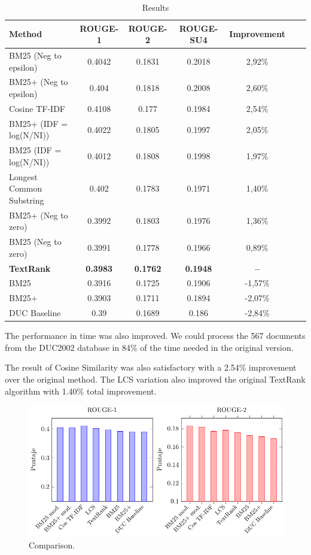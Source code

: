 \documentclass{llncs}
\begin{document}
\begin{table}
\caption{Results}
\begin{center}
\begin{tabular}{l*{5}{c}r}
\hline
\rule{0pt}{12pt}
Method & ROUGE-1 & ROUGE-2 & ROUGE-SU4 & Improvement \\[2pt]
\hline\rule{0pt}{12pt}\mbox{}\par\nobreak
BM25 (Neg to epsilon) & 0.4042 & 0.1831 & 0.2018 & 2,92\% \\
BM25+ (Neg to epsilon) & 0.404 & 0.1818 & 0.2008 & 2,60\% \\
Cosine TF-IDF & 0.4108 & 0.177 & 0.1984 & 2,54\% \\
BM25+ (IDF = log(N/NI)) & 0.4022 & 0.1805 & 0.1997 & 2,05\% \\ 
BM25 (IDF = log(N/NI)) & 0.4012 & 0.1808 & 0.1998 & 1,97\% \\ 
Longest Common Substring & 0.402 & 0.1783 & 0.1971 & 1,40\% \\
BM25+ (Neg to zero) & 0.3992 & 0.1803 & 0.1976 & 1,36\% \\ 
BM25 (Neg to zero) & 0.3991 & 0.1778 & 0.1966 & 0,89\% \\
\textbf{TextRank} & \textbf{0.3983} & \textbf{0.1762} & \textbf{0.1948} & \textbf{--}\\
BM25 & 0.3916 & 0.1725 & 0.1906 & -1,57\% \\
BM25+ & 0.3903 & 0.1711 & 0.1894 & -2,07\% \\
DUC Baseline & 0.39 & 0.1689 & 0.186 & -2,84\% \\ [2pt]
\hline
\end{tabular}
\end{center}
\end{table}

The performance in time was also improved. We could process the 567 documents from the DUC2002 database in 84\% of the time needed in the original version.

The result of Cosine Similarity was also satisfactory with a 2.54\% improvement over the original method. The LCS variation also improved the original TextRank algorithm with 1.40\% total improvement.

\begin{figure}[h!]
    \centering
    \includegraphics[width=1\textwidth]{rouge-scores.pdf}
    \caption{Comparison.}
\end{figure}
\end{document}
